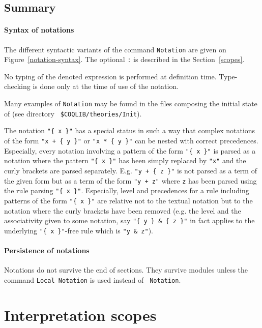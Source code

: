 \subsection{Summary}

\paragraph{Syntax of notations}

The different syntactic variants of the command \texttt{Notation} are
given on Figure~\ref{notation-syntax}. The optional {\tt :{\scope}} is
described in the Section~\ref{scopes}.

\Rem No typing of the denoted expression is performed at definition
time. Type-checking is done only at the time of use of the notation.

\Rem Many examples of {\tt Notation} may be found in the files
composing the initial state of {\Coq} (see directory {\tt
\$COQLIB/theories/Init}).

\Rem The notation \verb="{ x }"= has a special status in such a way
that complex notations of the form \verb="x + { y }"= or
\verb="x * { y }"= can be nested with correct precedences. Especially,
every notation involving a pattern of the form \verb="{ x }"= is
parsed as a notation where the pattern \verb="{ x }"= has been simply
replaced by \verb="x"= and the curly brackets are parsed separately.
E.g. \verb="y + { z }"= is not parsed as a term of the given form but
as a term of the form \verb="y + z"= where \verb=z= has been parsed
using the rule parsing \verb="{ x }"=. Especially, level and
precedences for a rule including patterns of the form \verb="{ x }"=
are relative not to the textual notation but to the notation where the
curly brackets have been removed (e.g. the level and the associativity
given to some notation, say \verb="{ y } & { z }"= in fact applies to
the underlying \verb="{ x }"=-free rule which is \verb="y & z"=).

\paragraph{Persistence of notations}

Notations do not survive the end of sections. They survive modules
unless the command {\tt Local Notation} is used instead of {\tt
Notation}.

\section[Interpretation scopes]{Interpretation scopes
\label{scopes}}

